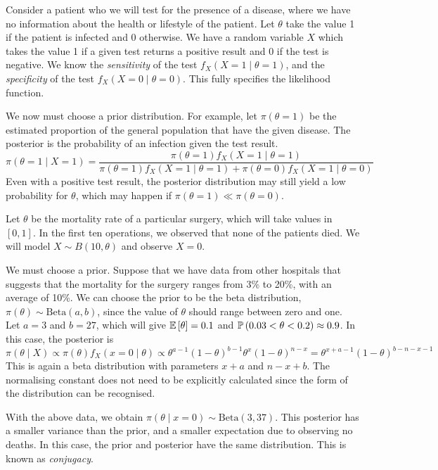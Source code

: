 \begin{example}
	Consider a patient who we will test for the presence of a disease, where we have no information about the health or lifestyle of the patient.
	Let \( \theta \) take the value 1 if the patient is infected and 0 otherwise.
	We have a random variable \( X \) which takes the value 1 if a given test returns a positive result and 0 if the test is negative.
	We know the \textit{sensitivity} of the test \( f_X(X=1\mid \theta=1) \), and the \textit{specificity} of the test \( f_X(X=0\mid \theta=0) \).
	This fully specifies the likelihood function.

	We now must choose a prior distribution.
	For example, let \( \pi(\theta = 1) \) be the estimated proportion of the general population that have the given disease.
	The posterior is the probability of an infection given the test result.
	\[
		\pi(\theta = 1 \mid X = 1) = \frac{\pi(\theta = 1) f_X(X = 1 \mid \theta = 1)}{\pi(\theta = 1) f_X(X = 1 \mid \theta = 1) + \pi(\theta = 0) f_X(X = 1 \mid \theta = 0)}
	\]
	Even with a positive test result, the posterior distribution may still yield a low probability for \( \theta \), which may happen if \( \pi(\theta = 1) \ll \pi(\theta = 0) \).
\end{example}
\begin{example}
	Let \( \theta \) be the mortality rate of a particular surgery, which will take values in \( [0,1] \).
	In the first ten operations, we observed that none of the patients died.
	We will model \( X \sim B(10,\theta) \) and observe \( X = 0 \).

	We must choose a prior.
	Suppose that we have data from other hospitals that suggests that the mortality for the surgery ranges from 3\% to 20\%, with an average of 10\%.
	We can choose the prior to be the beta distribution, \( \pi(\theta) \sim \mathrm{Beta}(a,b) \), since the value of \( \theta \) should range between zero and one.
	Let \( a = 3 \) and \( b = 27 \), which will give \( \mathbb{E}\left[{\theta}\right] = 0.1 \) and \( \mathbb{P}\left({0.03 < \theta < 0.2}\right) \approx 0.9 \).
	In this case, the posterior is
	\[
		\pi(\theta \mid X) \propto \pi(\theta) f_X(x = 0 \mid \theta) \propto \theta^{a-1} (1-\theta)^{b-1} \theta^x (1-\theta)^{n-x} = \theta^{x+a-1} (1-\theta)^{b-n-x-1}
	\]
	This is again a beta distribution with parameters \( x+a \) and \( n-x+b \).
	The normalising constant does not need to be explicitly calculated since the form of the distribution can be recognised.

	With the above data, we obtain \( \pi(\theta \mid x = 0) \sim \mathrm{Beta}(3,37) \).
	This posterior has a smaller variance than the prior, and a smaller expectation due to observing no deaths.
	In this case, the prior and posterior have the same distribution.
	This is known as \textit{conjugacy}.
\end{example}

